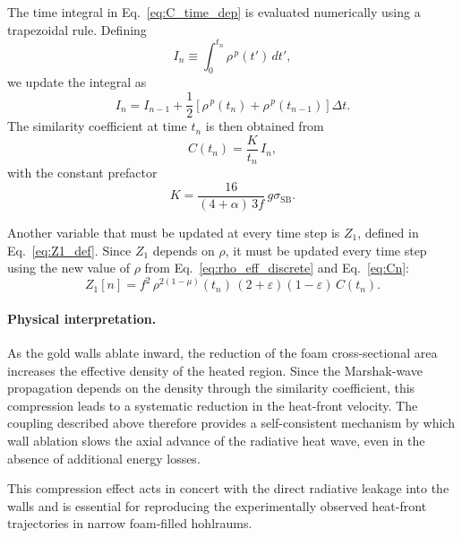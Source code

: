 \documentclass{article}
\begin{document}
The time integral in Eq.~\eqref{eq:C_time_dep} is evaluated numerically using a trapezoidal rule. Defining
\begin{equation}
I_n \equiv \int_0^{t_n} \rho^{\,p}(t')\,dt',
\end{equation}
we update the integral as
\begin{equation}
I_n
= I_{n-1}
+ \frac{1}{2}
\left[
\rho^{\,p}(t_n)
+
\rho^{\,p}(t_{n-1})
\right]\Delta t .
\label{eq:In_update}
\end{equation}
The similarity coefficient at time $t_n$ is then obtained from
\begin{equation}
C(t_n) = \frac{K}{t_n}\, I_n,
\label{eq:Cn}
\end{equation}
with the constant prefactor
\begin{equation}
K = \frac{16}{(4+\alpha)\,3f}\,g\sigma_{\mathrm{SB}} .
\end{equation}

Another variable that must be updated at every time step is $Z_1$, defined in Eq.~\eqref{eq:Z1_def}. Since $Z_1$ depends on $\rho$, it must be updated every time step using the new value of $\rho$ from Eq.~\eqref{eq:rho_eff_discrete} and Eq.~\eqref{eq:Cn}:
\begin{equation}
Z_1[n] = f^2\,\rho^{2(1-\mu)}(t_n)\,(2+\varepsilon)(1-\varepsilon)\,C(t_n).
\end{equation}

\paragraph{Physical interpretation.}
As the gold walls ablate inward, the reduction of the foam cross-sectional area increases the effective density of the heated region. Since the Marshak-wave propagation depends on the density through the similarity coefficient, this compression leads to a systematic reduction in the heat-front velocity. The coupling described above therefore provides a self-consistent mechanism by which wall ablation slows the axial advance of the radiative heat wave, even in the absence of additional energy losses.

This compression effect acts in concert with the direct radiative leakage into the walls and is essential for reproducing the experimentally observed heat-front trajectories in narrow foam-filled hohlraums.


\end{document}
